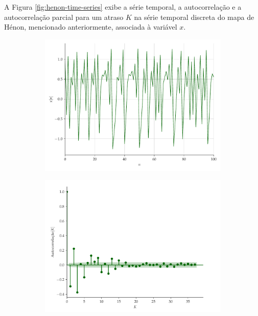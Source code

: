 \documentclass[a4paper, 12pt]{article}
\begin{document}
A Figura \ref{fig:henon-time-series} exibe a série temporal, a autocorrelação e a autocorrelação parcial para um atraso $K$ na série temporal discreta do mapa de Hénon, mencionado anteriormente, associada à variável $x$.
\begin{figure}[!ht]
	\centering
	\begin{subfigure}[b]{0.45\textwidth}
		\includegraphics[scale=0.4]{series-temporal-x.pdf}
	\end{subfigure}
	\begin{subfigure}[b]{0.45\textwidth}
		\includegraphics[scale=0.4]{autocorrelacao-henon.pdf}
	\end{subfigure}
	\\
	\begin{subfigure}[b]{0.45\textwidth}

\end{subfigure}
\end{figure}
\end{document}
